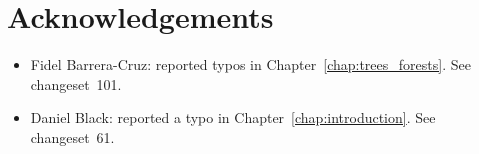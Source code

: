 
\chapter{Acknowledgements}

\begin{itemize}
\item Fidel Barrera-Cruz: reported typos in
  Chapter~\ref{chap:trees_forests}. See changeset~101.

\item Daniel Black: reported a typo in
  Chapter~\ref{chap:introduction}. See changeset~61.
\end{itemize}
